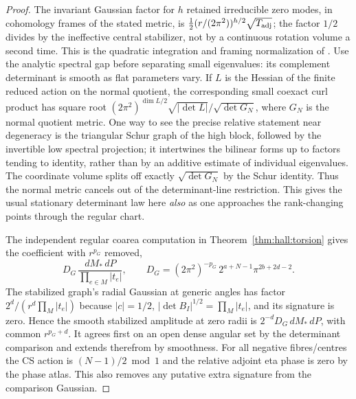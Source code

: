 \begin{proof}
The invariant Gaussian factor for \(h\) retained irreducible
zero modes, in cohomology frames of the stated metric, is
\(\tfrac12(r/(2\pi^2))^{h/2}\sqrt{T_{\rm adj}}\); the factor
\(1/2\) divides by the ineffective central stabilizer, not
by a continuous rotation volume a second time.
This is the quadratic integration and framing normalization
of \cite[eqs.~(3.3), (3.6)--(3.7), (3.14), (4.5)]{Adams}.
Use the analytic spectral gap before separating small eigenvalues:
its complement determinant is smooth as flat parameters vary.
If \(L\) is the Hessian of the finite reduced action on the
normal quotient, the corresponding small coexact curl product
has square root
\((2\pi^2)^{\dim L/2}\sqrt{|\det L|}/\sqrt{\det G_N}\),
where \(G_N\) is the normal quotient metric. One way to see
the precise relative statement near degeneracy is the
triangular Schur graph of the high block, followed by the
invertible low spectral projection; it intertwines the
bilinear forms up to factors tending to identity, rather
than by an additive estimate of individual eigenvalues.
The coordinate volume splits off exactly
\(\sqrt{\det G_N}\) by the Schur identity. Thus the normal
metric cancels out of the determinant-line restriction.
This gives the usual stationary determinant law here
\emph{also} as one approaches the rank-changing points
through the regular chart.

The independent regular coarea computation in
Theorem~\ref{thm:hall:torsion} gives the coefficient with
\(r^{p_G}\) removed,
\[
 D_G\,\frac{dM_*\,dP}{\prod_{e\in M}|t_e|},
 \qquad
 D_G=(2\pi^2)^{-p_G}\,2^{a+N-1}\pi^{2b+2d-2}.
\]
The stabilized graph's radial Gaussian at generic angles has
factor \(2^d/(r^d\prod_M |t_e|)\) because \(|c|=1/2\),
\(|\det B_I|^{1/2}=\prod_M|t_e|\), and its signature is zero.
Hence the smooth stabilized amplitude at zero radii is
\(2^{-d}D_G\,dM_*\,dP\), with common \(r^{p_G+d}\).
It agrees first on an open dense angular set by the
determinant comparison and extends therefrom by smoothness.
For all negative fibres/centres the CS action is
\((N-1)/2\bmod1\) and the relative adjoint eta phase is zero
by the phase atlas. This also removes any putative extra
signature from the comparison Gaussian.


\end{proof}
